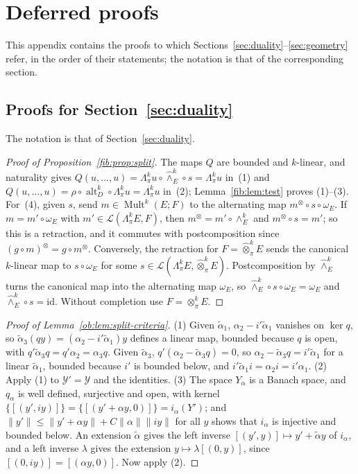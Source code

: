 \documentclass[11pt]{amsart}
\theoremstyle{definition}
\theoremstyle{remark}
\numberwithin{equation}{section}
\newcommand{\cL}{\mathcal L}
\newcommand{\Mult}{\operatorname{Mult}}
\newcommand{\id}{\mathrm{id}}
\newcommand{\norm}[1]{\lVert #1\rVert}
\theoremstyle{plain}
\theoremstyle{definition}
\theoremstyle{plain}
\begin{document}
\section{Deferred proofs}\label{app:deferred}

This appendix contains the proofs to which Sections~\ref{sec:duality}--\ref{sec:geometry} refer, in the order of
their statements; the notation is that of the corresponding section.
\subsection{Proofs for Section~\ref{sec:duality}}\label{dfr:ssec:duality}

The notation is that of Section~\ref{sec:duality}.

\begin{proof}[Proof of Proposition~\ref{fib:prop:split}]
The maps $Q$ are bounded and $k$\nobreakdash-linear, and naturality gives
$Q(u,\dots,u)=\Lambda^k_\pi u\circ\widehat\wedge^k_E\circ s=\Lambda^k_\pi u$ in~(1) and
$Q(u,\dots,u)=\rho\circ\operatorname{alt}^k_D\circ\Lambda^k_\pi u=\Lambda^k_\pi u$ in~(2); Lemma~\ref{fib:lem:test}
proves (1)--(3). For~(4), given $s$, send $m\in\Mult^k(E;F)$ to the alternating map $m^\otimes\circ s\circ\omega_E$. If
$m=m'\circ\omega_E$ with $m'\in\cL(\Lambda^k_\pi E,F)$, then $m^\otimes=m'\circ\wedge^k_E$ and $m^\otimes\circ s=m'$; so
this is a retraction, and it commutes with postcomposition since $(g\circ m)^\otimes=g\circ m^\otimes$. Conversely, the
retraction for $F=\widehat\otimes^k_\pi E$ sends the canonical $k$\nobreakdash-linear map to $s\circ\omega_E$ for some
$s\in\cL(\Lambda^k_\pi E,\widehat\otimes^k_\pi E)$. Postcomposition by $\widehat\wedge^k_E$ turns the canonical map into
the alternating map $\omega_E$, so $\widehat\wedge^k_E\circ s\circ\omega_E=\omega_E$ and $\widehat\wedge^k_E\circ s=\id$. Without completion use
$F=\otimes^k_\pi E$.
\end{proof}

\begin{proof}[Proof of Lemma~\ref{ob:lem:split-criteria}]
(1) Given $\tilde\alpha_1$, $\alpha_2-i'\tilde\alpha_1$ vanishes on $\ker q$, so
$\tilde\alpha_3(qy)=(\alpha_2-i'\tilde\alpha_1)y$ defines a linear map, bounded because $q$ is open, with
$q'\tilde\alpha_3q=q'\alpha_2=\alpha_3q$. Given $\tilde\alpha_3$, $q'(\alpha_2-\tilde\alpha_3q)=0$, so
$\alpha_2-\tilde\alpha_3q=i'\tilde\alpha_1$ for a linear $\tilde\alpha_1$, bounded because $i'$ is bounded below, and
$i'\tilde\alpha_1i=\alpha_2i=i'\alpha_1$. (2) Apply (1) to $\mathcal Y'=\mathcal Y$ and the identities. (3) The space
$Y_\alpha$ is a Banach space, and $q_\alpha$ is well defined, surjective and open, with kernel
$\{[(y',iy)]\}=\{[(y'+\alpha y,0)]\}=i_\alpha(Y')$; and $\norm{y'}\le\norm{y'+\alpha y}+C\norm\alpha\norm{iy}$ for all $y$
shows that $i_\alpha$ is injective and bounded below. An extension $\tilde\alpha$ gives the left inverse
$[(y',y)]\mapsto y'+\tilde\alpha y$ of $i_\alpha$, and a left inverse $\lambda$ gives the extension $y\mapsto\lambda[(0,y)]$, since $[(0,iy)]=[(\alpha y,0)]$. Now apply (2).
\end{proof}
\end{document}

